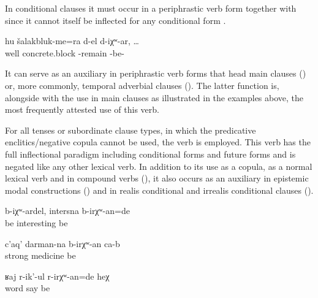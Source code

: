 In conditional clauses it must occur in a periphrastic verb form together with  since it cannot itself be inflected for any conditional form .
%
\begin{exe}
	\ex	\label{ex:If the concrete blocks remained (are left over)}
	\gll	hu		šalakbluk-me=ra	d-el	d-iχʷ-ar,	\ldots\\
		well		concrete.block	-remain\tsc{.pfv}	-be-\\
	\glt	{}
\end{exe}

It can serve as an auxiliary in periphrastic verb forms that head main clauses () or, more commonly, temporal adverbial clauses (). The latter function is, alongside with the use in main clauses as illustrated in the examples above, the most frequently attested use of this verb.

For all tenses or subordinate clause types, in which the predicative enclitics\slash negative copula cannot be used, the verb   is employed. This verb has the full inflectional paradigm including conditional forms  and future forms  and is negated like any other lexical verb. In addition to its use as a copula, as a normal lexical verb and in compound verbs (), it also occurs as an auxiliary in epistemic modal constructions  () and in realis conditional and irrealis conditional clauses ().
%
\begin{exe}
	\ex	\label{ex:If it would be like this, it would be interesting}
	\gll	b-iχʷ-ardel,	intersna	b-irχʷ-an=de\\
		be	interesting	be\\
	\glt	{}

	\ex	\label{ex:It will be a strong medicine}
	\gll	c'aq'	darman-na	b-irχʷ-an	ca-b\\
		strong	medicine be	\\
	\glt	{}

	\ex	\label{ex:She must have been quarreling}
	\gll	ʁaj	r-ik'-ul	r-irχʷ-an=de 	heχ\\
		word	say 	be 	\\
	\glt	{}
\end{exe}

